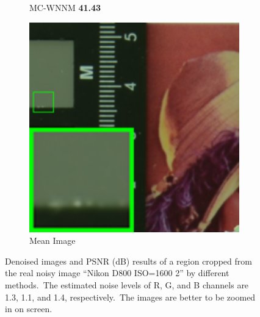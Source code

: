 \begin{figure}
\begin{subfigure}[t]{0.19\textwidth}
		\caption{MC-WNNM \textbf{41.43}}
    \end{subfigure}
    \hfill
    \begin{subfigure}[t]{0.19\textwidth}
        \centering
        \includegraphics[width=1\textwidth]{images/mcwnnm/cc/resize_br_d800_iso1600_2.png}
		\caption{Mean Image}
    \end{subfigure}
    \caption{Denoised images and PSNR (dB) results of a region cropped from the real noisy image ``Nikon D800 ISO=1600 2'' \cite{crosschannel2016} by different methods.\ The estimated noise levels of R, G, and B channels are 1.3, 1.1, and 1.4, respectively.\ The images are better to be zoomed in on screen.}
    \label{fig4-17}
\end{figure}

